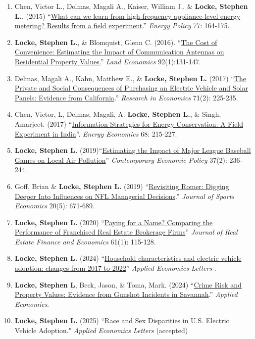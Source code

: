 \documentclass[10pt]{article}
\begin{document}
\begin{enumerate}
\item  Chen, Victor L., Delmas, Magali A., Kaiser, William J., \& \textbf{Locke, Stephen L.}. (2015) ``\href{http://www.sciencedirect.com/science/article/pii/S0301421514006296}{What can we learn from high-frequency appliance-level energy metering? Results from a field experiment.}''  \emph{Energy Policy} 77: 164-175. %
\item \textbf{Locke, Stephen L.}, \& Blomquist, Glenn C. (2016). ``\href{http://le.uwpress.org/content/92/1/131.short}{The Cost of Convenience: Estimating the Impact of Communication Antennas on Residential Property Values.}'' \emph{Land Economics} 92(1):131-147.  %
\item Delmas, Magali A., Kahn, Matthew E., \& \textbf{Locke, Stephen L.} (2017) ``\href{http://www.sciencedirect.com/science/article/pii/S109094431630254X}{The Private and Social Consequences of Purchasing an Electric Vehicle and Solar Panels:  Evidence from California}.'' \emph{Research in Economics} 71(2): 225-235. %
\item Chen, Victor, L, Delmas, Magali, A. \textbf{Locke, Stephen L.}, \& Singh, Amarjeet. (2017) ``\href{https://www.sciencedirect.com/science/article/pii/S0140988317303079}{Information Strategies for Energy Conservation:  A Field Experiment in India}''. \emph{Energy Economics} 68: 215-227. %
\item \textbf{Locke, Stephen L.} (2019)``\href{https://onlinelibrary.wiley.com/doi/full/10.1111/coep.12404}{Estimating the Impact of Major League Baseball Games on Local Air Pollution}'' \emph{Contemporary Economic Policy} 37(2): 236-244. %
\item Goff, Brian \& \textbf{Locke, Stephen L.} (2019) ``\href{http://journals.sagepub.com/doi/10.1177/1527002518798686}{Revisiting Romer: Digging Deeper Into Influences on NFL Managerial Decisions}.'' \emph{Journal of Sports Economics} 20(5): 671-689. %
\item \textbf{Locke, Stephen L.} (2020) ``\href{https://doi.org/10.1007/s11146-019-09702-2}{Paying for a Name? Comparing the Performance of Franchised Real Estate Brokerage Firms}'' \emph{Journal of Real Estate Finance and Economics} 61(1): 115-128. %
\item \textbf{Locke, Stephen L.} (2024) ``\href{https://doi.org/10.1080/13504851.2024.2386149}{Household characteristics and electric vehicle adoption: changes from 2017 to 2022}'' \emph{Applied Economics Letters} . %
\item \textbf{Locke, Stephen L}, Beck, Jason, \& Toma, Mark. (2024) ``\href{https://www.tandfonline.com/doi/full/10.1080/00036846.2024.2399816}{Crime Risk and Property Values: Evidence from Gunshot Incidents in Savannah}.'' \emph{Applied Economics}.
\item \textbf{Locke, Stephen L.} (2025) ``Race and Sex Disparities in U.S. Electric Vehicle Adoption." \emph{Applied Economics Letters} (accepted)
\end{enumerate}
\end{document}
